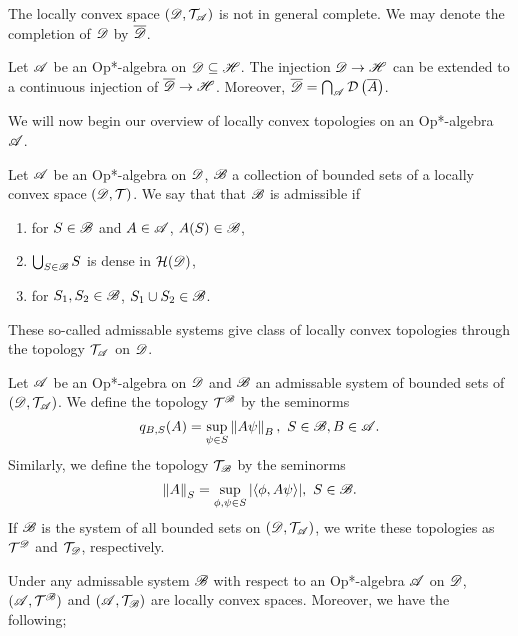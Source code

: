 \documentclass[../main.tex]{subfiles}
\begin{document}
The locally convex space $(\mathscr{D}, \mathcal{T}_\mathscr{A})$ is not in general complete. We may denote the completion of $\mathscr{D}$ by
$\overline{\mathscr{D}}$.

\begin{lemma}
	Let $\mathscr{A}$ be an Op*-algebra on $\mathscr{D} \subseteq \mathscr{H}$. The injection $\mathscr{D} \to \mathscr{H}$ can be extended to a continuous
	injection of $\overline{\mathscr{D}} \to \mathscr{H}$. Moreover, $\overline{\mathscr{D}} = \bigcap_\mathscr{A} \mathcal{D}\left(\overline{A}\right)$. 
\end{lemma}

We will now begin our overview of locally convex topologies on an Op*-algebra $\mathscr{A}$.

\begin{definition}
	Let $\mathscr{A}$ be an Op*-algebra on $\mathscr{D}$, $\mathscr{B}$  a collection of bounded sets of a locally convex space $(\mathscr{D}, \mathcal{T})$.
	We say that that $\mathscr{B}$ is admissible if

	\begin{enumerate}
		\item for $S \in \mathscr{B}$ and $A \in \mathscr{A}$, $A(S) \in \mathscr{B}$, 
		\item $\bigcup_{S \in \mathscr{B}} S$ is dense in $\mathcal{H}(\mathscr{D})$,
		\item for $S_1, S_2 \in \mathscr{B}$, $S_1 \cup S_2 \in \mathscr{B}$.
	\end{enumerate}



\end{definition}

These so-called admissable systems give class of locally convex topologies through the topology $\mathcal{T}_\mathscr{A}$ on 
$\mathscr{D}$.


\begin{definition}

	Let $\mathscr{A}$ be an Op*-algebra on $\mathscr{D}$ and $\mathscr{B}$ an admissable system of bounded sets of $(\mathscr{D}, \mathcal{T}_\mathscr{A})$.
	We define the topology $\mathcal{T}^\mathscr{B}$ by the seminorms \[ q_{B, S}(A) = \sup_{\psi \in S} \left\lVert A\psi\right\rVert_B, \ S \in \mathscr{B}, B \in \mathscr{A}. \] 
	Similarly, we define the topology $\mathcal{T}_\mathscr{B}$ by the seminorms \[\left\lVert A\right\rVert_S = \sup_{\phi, \psi \in S} |\langle \phi, A\psi \rangle|, \  S \in \mathscr{B}. \]
	If $\mathscr{B}$ is the system of all bounded sets on $(\mathscr{D}, \mathcal{T}_\mathscr{A})$, we write these topologies as $\mathcal{T}^\mathscr{D}$ and $\mathcal{T}_\mathscr{D}$, 
	respectively.

\end{definition}

Under any admissable system $\mathscr{B}$ with respect to an Op*-algebra $\mathscr{A}$ on $\mathscr{D}$, $(\mathscr{A}, \mathcal{T}^\mathscr{B})$ and $(\mathscr{A}, \mathcal{T}_\mathscr{B})$
are locally convex spaces. Moreover, we have the following;
\end{document}
